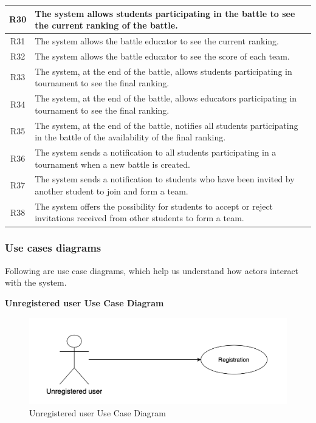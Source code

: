 \begin{tabular}{|c|p{13.2cm}|}
  \hline
  R30 & The system allows students participating in the battle to see the current ranking of the battle.  \\
  \hline
  R31 & The system allows the battle educator to see the current ranking.  \\
  \hline
  R32 & The system allows the battle educator to see the score of each team. \\
  \hline
  R33 & The system, at the end of the battle, allows students participating in tournament to see the final ranking. \\
  \hline
  R34 & The system, at the end of the battle, allows educators participating in tournament to see the final ranking. \\
  \hline
  R35 & The system, at the end of the battle, notifies all students participating in the battle of the availability of the final ranking. \\
  \hline
  R36 & The system sends a notification to all students participating in a tournament when a new battle is created. \\
  \hline
  R37 & The system sends a notification to students who have been invited by another student to join and form a team. \\
  \hline
  R38 & The system offers the possibility for students to accept or reject invitations received from other students to form a team. \\
  \hline
\end{tabular}

\clearpage

\subsubsection{Use cases diagrams}
Following are use case diagrams, which help us understand how actors interact with the system.

\vspace{1.3\baselineskip}

\textbf{Unregistered user Use Case Diagram}
\begin{figure}[h]
    \includegraphics[scale=0.7]{images/UseCaseDiagram/UnregisteredUserUseCaseDiagram.png} 
    \caption{Unregistered user Use Case Diagram}
    \label{fig_UnregistereduserUseCaseDiagram}
\end{figure}

